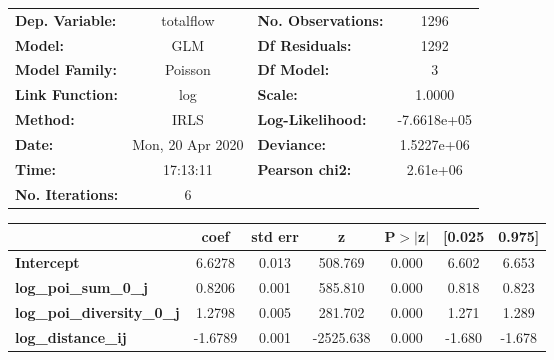 \begin{center}
\begin{tabular}{lclc}
\toprule
\textbf{Dep. Variable:}            &    totalflow     & \textbf{  No. Observations:  } &      1296    \\
\textbf{Model:}                    &       GLM        & \textbf{  Df Residuals:      } &      1292    \\
\textbf{Model Family:}             &     Poisson      & \textbf{  Df Model:          } &         3    \\
\textbf{Link Function:}            &       log        & \textbf{  Scale:             } &     1.0000   \\
\textbf{Method:}                   &       IRLS       & \textbf{  Log-Likelihood:    } & -7.6618e+05  \\
\textbf{Date:}                     & Mon, 20 Apr 2020 & \textbf{  Deviance:          } &  1.5227e+06  \\
\textbf{Time:}                     &     17:13:11     & \textbf{  Pearson chi2:      } &   2.61e+06   \\
\textbf{No. Iterations:}           &        6         & \textbf{                     } &              \\
\bottomrule
\end{tabular}
\begin{tabular}{lcccccc}
                                   & \textbf{coef} & \textbf{std err} & \textbf{z} & \textbf{P$> |$z$|$} & \textbf{[0.025} & \textbf{0.975]}  \\
\midrule
\textbf{Intercept}                 &       6.6278  &        0.013     &   508.769  &         0.000        &        6.602    &        6.653     \\
\textbf{log\_poi\_sum\_0\_j}       &       0.8206  &        0.001     &   585.810  &         0.000        &        0.818    &        0.823     \\
\textbf{log\_poi\_diversity\_0\_j} &       1.2798  &        0.005     &   281.702  &         0.000        &        1.271    &        1.289     \\
\textbf{log\_distance\_ij}         &      -1.6789  &        0.001     & -2525.638  &         0.000        &       -1.680    &       -1.678     \\
\bottomrule
\end{tabular}
\end{center}